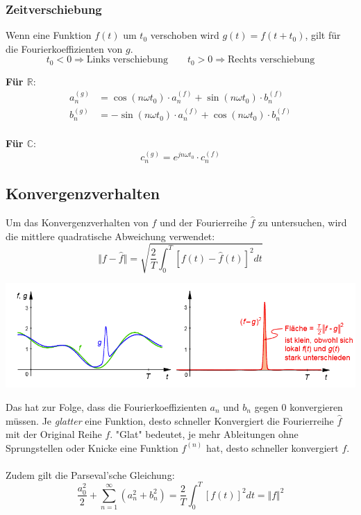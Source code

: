\subsubsection{Zeitverschiebung}
Wenn eine Funktion $f(t)$ um $t_0$ verschoben wird $g(t) = f(t + t_0)$, gilt für die Fourierkoeffizienten von $g$.
\[
t_0 < 0 \Rightarrow \text{Links verschiebung} \qquad t_0 > 0 \Rightarrow \text{Rechts verschiebung}
\]

\noindent\textbf{Für $\mathbb{R}$}:
\begin{align*}
	a_n^{(g)} &= \cos(n\omega t_0) \cdot a_n^{(f)} + \sin(n\omega t_0) \cdot b_n^{(f)}  \\
	b_n^{(g)} &= -\sin(n\omega t_0) \cdot a_n^{(f)} + \cos(n\omega t_0) \cdot b_n^{(f)}  \\
\end{align*}

\noindent\textbf{Für $\mathbb{C}$}:
\[
c_n^{(g)} = e^{jn\omega t_0} \cdot c_n^{(f)}
\]

\subsection{Konvergenzverhalten}
Um das Konvergenzverhalten von $f$ und der Fourierreihe $\hat{f}$ zu untersuchen, wird die mittlere quadratische Abweichung verwendet:
\[
\Vert f - \hat{f} \Vert = \sqrt{\frac{2}{T}\int_{0}^{T}\left[f(t) - \hat{f}(t)\right]^2dt}
\]
\begin{center}
	\includegraphics[width=\columnwidth]{Images/konvergenz}
\end{center}

\noindent Das hat zur Folge, dass die Fourierkoeffizienten $a_n$ und $b_n$ gegen $0$ konvergieren müssen. Je \textit{glatter} eine Funktion, desto schneller Konvergiert die Fourierreihe $\hat{f}$ mit der Original Reihe $f$. "Glat" bedeutet, je mehr Ableitungen ohne Sprungstellen oder Knicke eine Funktion $f^{(n)}$ hat, desto schneller konvergiert $f$.
~\\
\noindent Zudem gilt die Parseval'sche Gleichung:
\[
\frac{a_0^2}{2} + \sum\limits_{n=1}^{\infty}\left(a_n^2 + b_n^2\right) = \frac{2}{T}\int_{0}^{T}[f(t)]^2dt = \Vert f \Vert^2
\]
